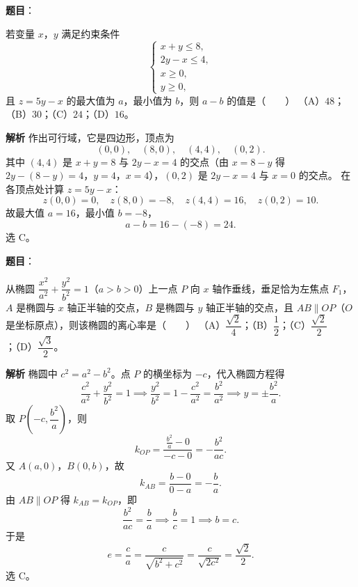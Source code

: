 \begin{answer}

\textbf{题目}：

若变量 $x$，$y$ 满足约束条件
\nopagebreak[4]
\[\begin{cases}x+y\leqslant8,\\[2pt] 2y-x\leqslant4,\\[2pt] x\geqslant0,\\[2pt] y\geqslant0,\end{cases}\]
且 $z=5y-x$ 的最大值为 $a$，最小值为 $b$，则 $a-b$ 的值是\mbox{（　　）}
（A）$48$；（B）$30$；（C）$24$；（D）$16$。

\textbf{解析}
作出可行域，它是四边形，顶点为
\nopagebreak[4]
\[(0,0),\quad(8,0),\quad(4,4),\quad(0,2).\]
其中 $(4,4)$ 是 $x+y=8$ 与 $2y-x=4$ 的交点（由 $x=8-y$ 得 $2y-(8-y)=4$，$y=4$，$x=4$），$(0,2)$ 是 $2y-x=4$ 与 $x=0$ 的交点。
在各顶点处计算 $z=5y-x$：
\nopagebreak[4]
\[z(0,0)=0,\quad z(8,0)=-8,\quad z(4,4)=16,\quad z(0,2)=10.\]
故最大值 $a=16$，最小值 $b=-8$，
\nopagebreak[4]
\[a-b=16-(-8)=24.\]
选 C。


\end{answer}
\begin{answer}

\textbf{题目}：

从椭圆 $\dfrac{x^2}{a^2}+\dfrac{y^2}{b^2}=1$（$a>b>0$）上一点 $P$ 向 $x$ 轴作垂线，垂足恰为左焦点 $F_1$，$A$ 是椭圆与 $x$ 轴正半轴的交点，$B$ 是椭圆与 $y$ 轴正半轴的交点，且 $AB\parallel OP$（$O$ 是坐标原点），则该椭圆的离心率是\mbox{（　　）}
（A）$\dfrac{\sqrt2}{4}$；（B）$\dfrac12$；（C）$\dfrac{\sqrt2}{2}$；（D）$\dfrac{\sqrt3}{2}$。

\textbf{解析}
椭圆中 $c^2=a^2-b^2$。点 $P$ 的横坐标为 $-c$，代入椭圆方程得
\nopagebreak[4]
\[\frac{c^2}{a^2}+\frac{y^2}{b^2}=1\implies\frac{y^2}{b^2}=1-\frac{c^2}{a^2}=\frac{b^2}{a^2}\implies y=\pm\frac{b^2}a.\]
取 $P\left(-c,\dfrac{b^2}a\right)$，则
\nopagebreak[4]
\[k_{OP}=\frac{\frac{b^2}a-0}{-c-0}=-\frac{b^2}{ac}.\]
又 $A(a,0)$，$B(0,b)$，故
\nopagebreak[4]
\[k_{AB}=\frac{b-0}{0-a}=-\frac ba.\]
由 $AB\parallel OP$ 得 $k_{AB}=k_{OP}$，即
\nopagebreak[4]
\[\frac{b^2}{ac}=\frac ba\implies\frac bc=1\implies b=c.\]
于是
\nopagebreak[4]
\[e=\frac ca=\frac c{\sqrt{b^2+c^2}}=\frac c{\sqrt{2c^2}}=\frac{\sqrt2}2.\]
选 C。


\end{answer}
